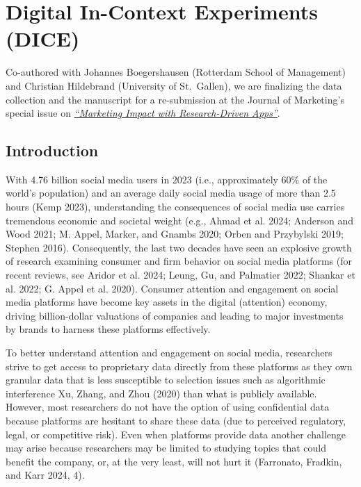 \documentclass[
  a4paper,
]{scrreprt}
\begin{document}
\hypertarget{digital-in-context-experiments-dice}{%
\chapter{Digital In-Context Experiments
(DICE)}\label{digital-in-context-experiments-dice}}

Co-authored with Johannes Boegershausen (Rotterdam School of Management)
and Christian Hildebrand (University of St.~Gallen), we are finalizing
the data collection and the manuscript for a re-submission at the
Journal of Marketing's special issue on
\href{https://www.ama.org/journal-of-marketing-call-for-papers-marketing-impact-with-research-driven-apps/}{\emph{``Marketing
Impact with Research-Driven Apps''}}.

\hypertarget{introduction-1}{%
\section{Introduction}\label{introduction-1}}

With 4.76 billion social media users in 2023 (i.e., approximately 60\%
of the world's population) and an average daily social media usage of
more than 2.5 hours (Kemp 2023), understanding the consequences of
social media use carries tremendous economic and societal weight (e.g.,
Ahmad et al. 2024; Anderson and Wood 2021; M. Appel, Marker, and Gnambs
2020; Orben and Przybylski 2019; Stephen 2016). Consequently, the last
two decades have seen an explosive growth of research examining consumer
and firm behavior on social media platforms (for recent reviews, see
Aridor et al. 2024; Leung, Gu, and Palmatier 2022; Shankar et al. 2022;
G. Appel et al. 2020). Consumer attention and engagement on social media
platforms have become key assets in the digital (attention) economy,
driving billion-dollar valuations of companies and leading to major
investments by brands to harness these platforms effectively.

To better understand attention and engagement on social media,
researchers strive to get access to proprietary data directly from these
platforms as they own granular data that is less susceptible to
selection issues such as algorithmic interference Xu, Zhang, and Zhou
(2020) than what is publicly available. However, most researchers do not
have the option of using confidential data because platforms are
hesitant to share these data (due to perceived regulatory, legal, or
competitive risk). Even when platforms provide data another challenge
may arise because researchers may be limited to studying topics that
could benefit the company, or, at the very least, will not hurt it
(Farronato, Fradkin, and Karr 2024, 4).
\end{document}
